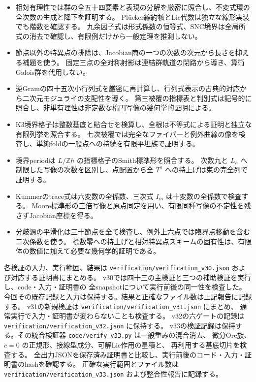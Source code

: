 \begin{itemize}
最小次数六の閉点の実在は、指数の定義だけに任せず、次数三と二の直線切断から構成する。
\item 相対有理性では群の全五十四要素と表現の分解を厳密に照合し、不変式環の全次数の生成と降下を証明する。
Pl\"ucker縮約核とLie代数は独立な線形実装でも階数を確認する。
九余因子式は形式係数の恒等式、SNC境界は全局所式の消去で確認し、有限例だけから一般定理を推測しない。
\item 節点以外の特異点の排除は、Jacobian商の一つの次数の次元から長さを抑える補題を使う。
固定三点の全対称射影は連結群軌道の閉路から導き、算術Galois群を代用しない。
\item 逆Gramの四十五次小行列式を厳密に再計算し、行列式表示の古典的対応から二次元モジュライの支配性を導く。
第三被覆の指標表と判別式は記号的に照合し、非単有理性は非定数な楕円写像の幾何学的証明による。
\item K3境界格子は整数基底と貼合せを検算し、全根は不等式による証明と独立な有限列挙を照合する。
七次被覆では完全なファイバーと例外曲線の像を検査し、単純foldの一般点への持続を有限平坦族で証明する。
\item 境界periodは $L/\mathbb Zh$ の指標格子のSmith標準形を照合する。
次数九と $L_h$ へ制限した写像の次数を区別し、点配置から全 $T^1$ への持上げは束の完全列で証明する。
\item Kummerのtrace式は六変数の全係数、三次式 $I_m$ は十変数の全係数で検査する。
Moore標準形の三倍写像と原点同定を用い、有限同種写像の不定性を残さずJacobian座標を得る。
\item 分岐源の平滑化は三十節点を全て検査し、例外上六点では臨界点移動を含む二次係数を使う。
標数零への持上げと相対特異点スキームの固有性は、有限体の数値に加えて必要な幾何学的証明である。
\end{itemize}
各検証の入力、実行範囲、結果は
\nolinkurl{verification/verification_v30.json} および対応する証明書にまとめる。
v30では四十三の主検証と三つの補助検証を実行し、code・入力・証明書の
全snapshotについて実行前後の同一性を検査した。今回その既存記録と入力は保持する。結果と正確なファイル数は上記報告に記録する。
v31の新規検証は \nolinkurl{verification/verification_v31.json} にまとめ、
通常実行で入力・証明書が変わらないことも検査する。
v32の六ゲートの記録は \nolinkurl{verification/verification_v32.json} に保持する。
v33の検証記録は保持する。その統合検証器 \nolinkurl{code/verify_v33.py} は一般重みの混合消去、
微分Ore族、$c=0$ の正規形、接線型成分、可解Lie作用の星積と、
再利用する基底切片を検査する。
全出力JSONを保存済み証明書と比較し、実行前後のコード・入力・証明書のhashを確認する。
正確な実行範囲とファイル数は \nolinkurl{verification/verification_v33.json} および整合性報告に記録する。
